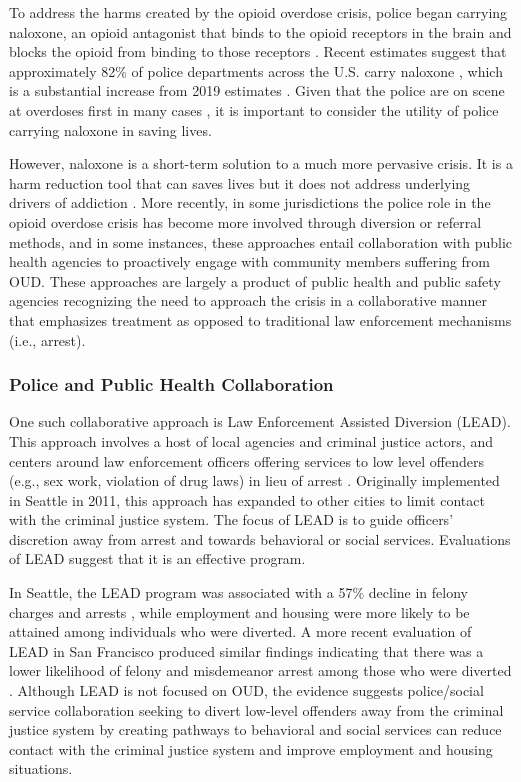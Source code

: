 To address the harms created by the opioid overdose crisis, police began carrying naloxone, an opioid antagonist that binds to the opioid receptors in the brain and blocks the opioid from binding to those receptors \parencite{lurigio_opioid_2018}. Recent estimates suggest that approximately 82\% of police departments across the U.S. carry naloxone \parencite{ray_national_2023}, which is a substantial increase from 2019 estimates \parencite{quinn_most_2019}. Given that the police are on scene at overdoses first in many cases \parencite{beletsky_police_2011, silverman_harmonizing_2012, white_leveraging_2022}, it is important to consider the utility of police carrying naloxone in saving lives. 

However, naloxone is a short-term solution to a much more pervasive crisis. It is a harm reduction tool that can saves lives but it does not address underlying drivers of addiction \parencite{goodison_law_2019, rando_intranasal_2015, rees_little_2019}. More recently, in some jurisdictions the police role in the opioid overdose crisis has become more involved through diversion or referral methods, and in some instances, these approaches entail collaboration with public health agencies to proactively engage with community members suffering from OUD. These approaches are largely a product of public health and public safety agencies recognizing the need to approach the crisis in a collaborative manner that emphasizes treatment as opposed to traditional law enforcement mechanisms (i.e., arrest).

\subsubsection{Police and Public Health Collaboration}

One such collaborative approach is Law Enforcement Assisted Diversion (LEAD). This approach involves a host of local agencies and criminal justice actors, and centers around law enforcement officers offering services to low level offenders (e.g., sex work, violation of drug laws) in lieu of arrest \parencite{national_institute_of_justice_program_2016}. Originally implemented in Seattle in 2011, this approach has expanded to other cities to limit contact with the criminal justice system. The focus of LEAD is to guide officers' discretion away from arrest and towards behavioral or social services. Evaluations of LEAD suggest that it is an effective program.

In Seattle, the LEAD program was associated with a 57\% decline in felony charges and arrests \parencite{collins_seattles_2017}, while employment and housing were more likely to be attained \parencite{clifasefi_seattles_2017} among individuals who were diverted. A more recent evaluation of LEAD in San Francisco produced similar findings indicating that there was a lower likelihood of felony and misdemeanor arrest among those who were diverted \parencite{perrone_harm_2022}. Although LEAD is not focused on OUD, the evidence suggests police/social service collaboration seeking to divert low-level offenders away from the criminal justice system by creating pathways to behavioral and social services can reduce contact with the criminal justice system and improve employment and housing situations.

